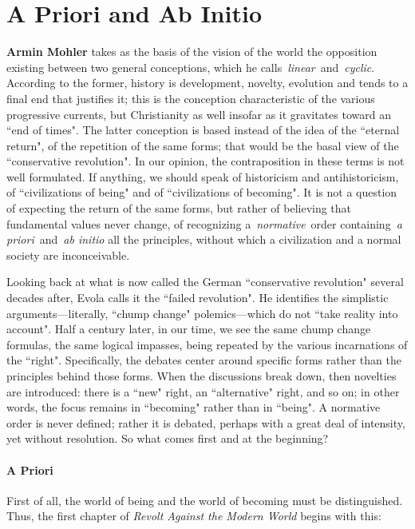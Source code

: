 \section{A Priori and Ab Initio}

\begin{quotex}
\textbf{Armin Mohler} takes as the basis of the vision of the world the opposition existing between two general conceptions, which he calls \emph{linear} and \emph{cyclic}. According to the former, history is development, novelty, evolution and tends to a final end that justifies it; this is the conception characteristic of the various progressive currents, but Christianity as well insofar as it gravitates toward an ``end of times". The latter conception is based instead of the idea of the ``eternal return", of the repetition of the same forms; that would be the basal view of the ``conservative revolution". In our opinion, the contraposition in these terms is not well formulated. If anything, we should speak of historicism and antihistoricism, of ``civilizations of being" and of ``civilizations of becoming". It is not a question of expecting the return of the same forms, but rather of believing that fundamental values never change, of recognizing a \emph{normative} order containing \emph{a priori} and \emph{ab initio }all the principles, without which a civilization and a normal society are inconceivable.  

\end{quotex}
Looking back at what is now called the German ``conservative revolution" several decades after, Evola calls it the ``failed revolution". He identifies the simplistic arguments—literally, ``chump change" polemics—which do not ``take reality into account". Half a century later, in our time, we see the same chump change formulas, the same logical impasses, being repeated by the various incarnations of the ``right". Specifically, the debates center around specific forms rather than the principles behind those forms. When the discussions break down, then novelties are introduced: there is a ``new" right, an ``alternative" right, and so on; in other words, the focus remains in ``becoming" rather than in ``being". A normative order is never defined; rather it is debated, perhaps with a great deal of intensity, yet without resolution. So what comes first and at the beginning?

\paragraph{A Priori}
First of all, the world of being and the world of becoming must be distinguished. Thus, the first chapter of \emph{Revolt Against the Modern World} begins with this:

